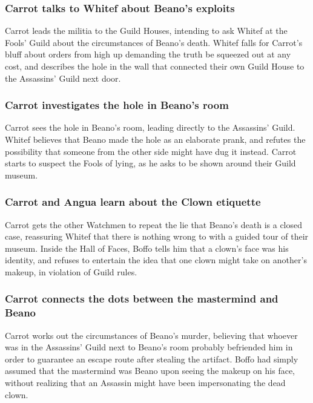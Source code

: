 \subsubsection{\Gls{Carrot} talks to \Gls{Whitef} about \Gls{Beano}'s exploits}
\Gls{Carrot} leads the militia to the Guild Houses, intending to ask \Gls{Whitef} at the Fools'
Guild about the circumstances of \Gls{Beano}'s death. \Gls{Whitef} falls for \Gls{Carrot}'s bluff
about orders from high up demanding the truth be squeezed out at any cost, and describes the hole in
the wall that connected their own Guild House to the Assassins' Guild next door.

\subsubsection{\Gls{Carrot} investigates the hole in \Gls{Beano}'s room}
\Gls{Carrot} sees the hole in \Gls{Beano}'s room, leading directly to the Assassins' Guild.
\Gls{Whitef} believes that \Gls{Beano} made the hole as an elaborate prank, and refutes the
possibility that someone from the other side might have dug it instead. \Gls{Carrot} starts to
suspect the Fools of lying, as he asks to be shown around their Guild museum.

\subsubsection{\Gls{Carrot} and \Gls{Angua} learn about the Clown etiquette}
\Gls{Carrot} gets the other Watchmen to repeat the lie that \Gls{Beano}'s death is a closed case,
reassuring \Gls{Whitef} that there is nothing wrong to with a guided tour of their museum. Inside
the Hall of Faces, \Gls{Boffo} tells him that a clown's face was his identity, and refuses to
entertain the idea that one clown might take on another's makeup, in violation of Guild rules.

\subsubsection{\Gls{Carrot} connects the dots between the mastermind and \Gls{Beano}}
\Gls{Carrot} works out the circumstances of \Gls{Beano}'s murder, believing that whoever was in the
Assassins' Guild next to \Gls{Beano}'s room probably befriended him in order to guarantee an escape
route after stealing the artifact. \Gls{Boffo} had simply assumed that the mastermind was
\Gls{Beano} upon seeing the makeup on his face, without realizing that an Assassin might have been
impersonating the dead clown.

